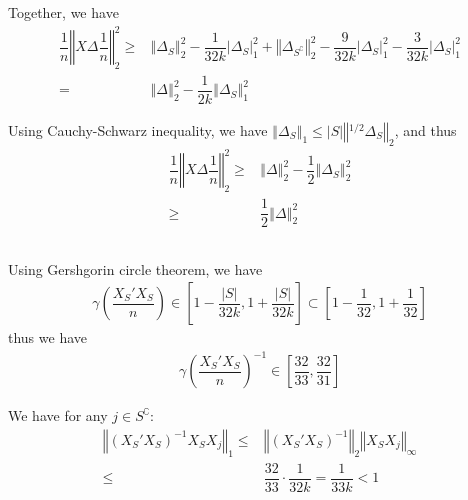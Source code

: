 \documentclass[11pt,a4paper]{ctexart}
\numberwithin{equation}{section}%
\begin{document}
Together, we have
\begin{align*}
    \dfrac{ 1 }{ n } \left\Vert X\Delta  \dfrac{ 1 }{ n }\right\Vert _2^2 \geq & \left\Vert \Delta _S  \right\Vert _2^2 - \dfrac{ 1 }{ 32k } \left\vert \Delta _S \right\vert _1^2 + \left\Vert \Delta _{S^\complement}  \right\Vert _2^2 - \dfrac{ 9 }{ 32k } \left\vert \Delta _{S} \right\vert _1^2 - \dfrac{ 3 }{ 32k } \left\vert \Delta _S \right\vert _1 ^2 \\
    = & \left\Vert \Delta  \right\Vert _2^2 - \dfrac{ 1 }{ 2k } \left\Vert \Delta _S \right\Vert _1^2
\end{align*}

Using Cauchy-Schwarz inequality, we have $ \left\Vert \Delta _S \right\Vert _1\leq \left\vert S  \right\vert \left\Vert ^{1/2} \Delta _S  \right\Vert _2 $, and thus
\begin{align*}
    \dfrac{ 1 }{ n } \left\Vert X\Delta  \dfrac{ 1 }{ n }\right\Vert _2^2 \geq &\left\Vert \Delta  \right\Vert _2^2 - \dfrac{ 1 }{ 2 } \left\Vert \Delta _S \right\Vert _2^2\\
    \geq & \dfrac{ 1 }{ 2 } \left\Vert \Delta  \right\Vert _2^2
\end{align*}




\subsection{}

Using Gershgorin circle theorem, we have
\begin{align*}
    \gamma (\dfrac{ X_S'X_S }{ n } ) \in [1-\dfrac{ \left\vert S \right\vert  }{ 32k }, 1+\dfrac{ \left\vert S \right\vert  }{ 32k }]\subset [1-\dfrac{ 1 }{ 32 }, 1+\dfrac{ 1 }{ 32 }] 
\end{align*}
thus we have
\begin{align*}
    \gamma (\dfrac{ X_S'X_S }{ n } )^{-1} \in [\dfrac{ 32 }{ 33 }, \dfrac{ 32 }{ 31 }]  
\end{align*}

We have for any $ j\in S^\complement $:
\begin{align*}
    \left\Vert (X_S'X_S)^{-1}X_SX_j \right\Vert  _1 \leq & \left\Vert (X_S'X_S)^{-1} \right\Vert _2 \left\Vert X_SX_j \right\Vert _\infty \\
     \leq & \dfrac{ 32 }{ 33 } \cdot \dfrac{ 1 }{ 32k }= \dfrac{ 1 }{ 33k } < 1  
\end{align*}


\subsection{}
\end{document}

